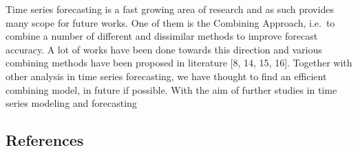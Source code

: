 \documentclass[
  letterpaper,
  DIV=11,
  numbers=noendperiod]{scrartcl}
\begin{document}
Time series forecasting is a fast growing area of research and as such
provides many scope for future works. One of them is the Combining
Approach, i.e.~to combine a number of different and dissimilar methods
to improve forecast accuracy. A lot of works have been done towards this
direction and various combining methods have been proposed in literature
{[}8, 14, 15, 16{]}. Together with other analysis in time series
forecasting, we have thought to find an efficient combining model, in
future if possible. With the aim of further studies in time series
modeling and forecasting

\hypertarget{references}{%
\subsection{References}\label{references}}
\end{document}
